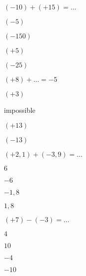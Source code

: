 


\begin{QCM}
  \begin{GroupeQCM}
    \begin{exercice}
      $(-10) + (+15) = \ldots$
      \begin{ChoixQCM}{4}
      \item $(-5)$
      \item $(-150)$
      \item $(+5)$
      \item $(-25)$
      \end{ChoixQCM}
\begin{corrige}
   \end{corrige}
    \end{exercice}
    
    
    \begin{exercice}
      $(+8) + \ldots = -5$
      \begin{ChoixQCM}{4}
      \item $(+3)$
      \item impossible
      \item $(+13)$
      \item $(-13)$
      \end{ChoixQCM}
\begin{corrige}
   \end{corrige}
    \end{exercice}


    \begin{exercice}
      $(+2,1) + (-3,9) = \ldots$
      \begin{ChoixQCM}{4}
      \item $6$
      \item $-6$
      \item $-1,8$
      \item $1,8$
      \end{ChoixQCM}
\begin{corrige}
   \end{corrige}
    \end{exercice}


    \begin{exercice}
      $(+7) - (-3) = \ldots$
      \begin{ChoixQCM}{4}
      \item $4$
      \item $10$
      \item $-4$
      \item $-10$
      \end{ChoixQCM}
\begin{corrige}
   \end{corrige}
    \end{exercice}



\end{GroupeQCM}
\end{QCM}
